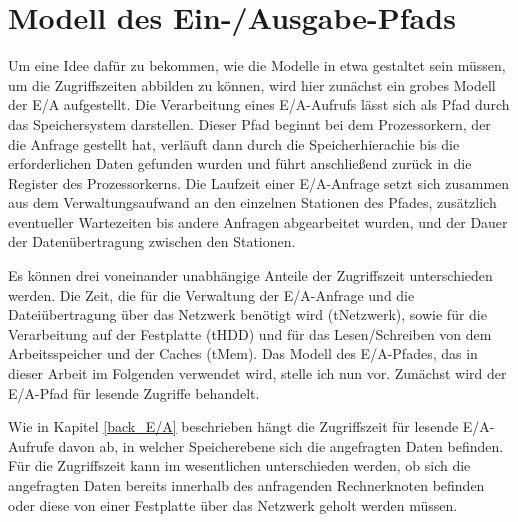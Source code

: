 \documentclass[
	12pt,
	a4paper,
	BCOR10mm,
	DIV14,
	listof=totoc,
	bibliography=totoc,
	headsepline
]{scrreprt}
\begin{document}
\section{Modell des Ein-/Ausgabe-Pfads}
\label{ea_modell}
Um eine Idee dafür zu bekommen, wie die Modelle in etwa gestaltet sein müssen, um die Zugriffszeiten abbilden zu können, wird hier zunächst ein grobes Modell der E/A aufgestellt.
Die Verarbeitung eines E/A-Aufrufs lässt sich als Pfad durch das Speichersystem darstellen.
Dieser Pfad beginnt bei dem Prozessorkern, der die Anfrage gestellt hat, verläuft dann durch die Speicherhierachie bis die erforderlichen Daten gefunden wurden und führt anschließend zurück in die Register des Prozessorkerns.
Die Laufzeit einer E/A-Anfrage setzt sich zusammen aus dem Verwaltungsaufwand an den einzelnen Stationen des Pfades, zusätzlich eventueller Wartezeiten bis andere Anfragen abgearbeitet wurden, und der Dauer der Datenübertragung zwischen den Stationen.

Es können drei voneinander unabhängige Anteile der Zugriffszeit unterschieden werden. Die Zeit, die für die Verwaltung der E/A-Anfrage und die Dateiübertragung über das Netzwerk benötigt wird (tNetzwerk), sowie für die Verarbeitung auf der Festplatte (tHDD) und für das Lesen/Schreiben von dem Arbeitsspeicher und der Caches (tMem).
\medskip
Das Modell des E/A-Pfades, das in dieser Arbeit im Folgenden verwendet wird, stelle ich nun vor. Zunächst wird der E/A-Pfad für lesende Zugriffe behandelt.

Wie in Kapitel \ref{back_E/A} beschrieben hängt die Zugriffszeit für lesende E/A-Aufrufe davon ab, in welcher Speicherebene sich die angefragten Daten befinden.
Für die Zugriffszeit kann im wesentlichen unterschieden werden, ob sich die angefragten Daten bereits innerhalb des anfragenden Rechnerknoten befinden oder diese von einer Festplatte über das Netzwerk geholt werden müssen.
\end{document}
